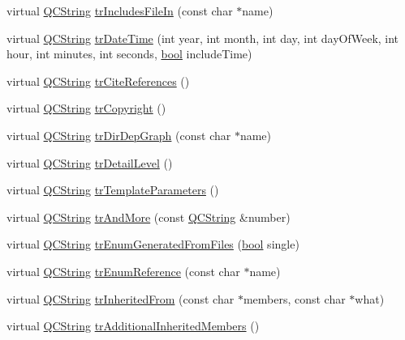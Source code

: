 \begin{DoxyCompactItemize}
\item 
virtual \hyperlink{class_q_c_string}{Q\+C\+String} \hyperlink{class_translator_czech_af25091b49c6cc81def3e115dfa919fde}{tr\+Includes\+File\+In} (const char $\ast$name)
\item 
virtual \hyperlink{class_q_c_string}{Q\+C\+String} \hyperlink{class_translator_czech_a48e59377a035fcd38d3a0df78f0f98f4}{tr\+Date\+Time} (int year, int month, int day, int day\+Of\+Week, int hour, int minutes, int seconds, \hyperlink{qglobal_8h_a1062901a7428fdd9c7f180f5e01ea056}{bool} include\+Time)
\item 
virtual \hyperlink{class_q_c_string}{Q\+C\+String} \hyperlink{class_translator_czech_a4a5a577ed4856ae95acd3c4e21016f79}{tr\+Cite\+References} ()
\item 
virtual \hyperlink{class_q_c_string}{Q\+C\+String} \hyperlink{class_translator_czech_a4ea7a83c65de11eef9640547fce14822}{tr\+Copyright} ()
\item 
virtual \hyperlink{class_q_c_string}{Q\+C\+String} \hyperlink{class_translator_czech_a6f0821145ad572fdce9b88d04bb89f41}{tr\+Dir\+Dep\+Graph} (const char $\ast$name)
\item 
virtual \hyperlink{class_q_c_string}{Q\+C\+String} \hyperlink{class_translator_czech_a15941f83613d8d969fcc3164331b21f6}{tr\+Detail\+Level} ()
\item 
virtual \hyperlink{class_q_c_string}{Q\+C\+String} \hyperlink{class_translator_czech_a9fc761503e57646ae0976e0db403382b}{tr\+Template\+Parameters} ()
\item 
virtual \hyperlink{class_q_c_string}{Q\+C\+String} \hyperlink{class_translator_czech_a3925eedadc2e79f8d8ede9e0d2fc3d7f}{tr\+And\+More} (const \hyperlink{class_q_c_string}{Q\+C\+String} \&number)
\item 
virtual \hyperlink{class_q_c_string}{Q\+C\+String} \hyperlink{class_translator_czech_abf472af923eb272404b3b67ff6f4e764}{tr\+Enum\+Generated\+From\+Files} (\hyperlink{qglobal_8h_a1062901a7428fdd9c7f180f5e01ea056}{bool} single)
\item 
virtual \hyperlink{class_q_c_string}{Q\+C\+String} \hyperlink{class_translator_czech_a6622844b3e07edccd546bd063c9a5185}{tr\+Enum\+Reference} (const char $\ast$name)
\item 
virtual \hyperlink{class_q_c_string}{Q\+C\+String} \hyperlink{class_translator_czech_abf4f9fcda10ccf0df5bce70c78900843}{tr\+Inherited\+From} (const char $\ast$members, const char $\ast$what)
\item 
virtual \hyperlink{class_q_c_string}{Q\+C\+String} \hyperlink{class_translator_czech_a52803f80796ce4469cd5fb8c16a53b7e}{tr\+Additional\+Inherited\+Members} ()

\end{DoxyCompactItemize}
